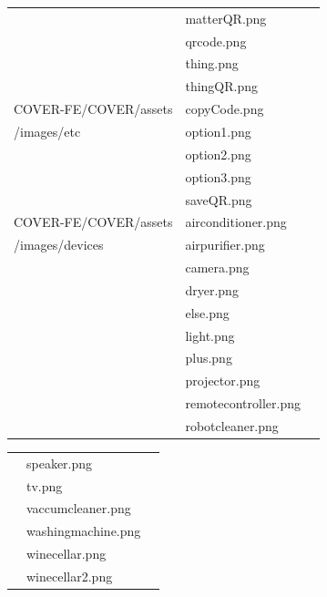 \documentclass[conference]{IEEEtran}
\begin{document}
\begin{enumerate}[label=\arabic*.]
\begin{table}[h!]
\begin{tabular}{|l|l|l|}
 & matterQR.png &  \\
 & qrcode.png &  \\
 & thing.png &  \\
 & thingQR.png &  \\
\hline
COVER-FE/COVER/assets & copyCode.png & \\
/images/etc & option1.png & \\
 & option2.png & \\
 & option3.png & \\
 & saveQR.png & \\
\hline
COVER-FE/COVER/assets & airconditioner.png & \\
/images/devices & airpurifier.png & \\
 & camera.png & \\
 & dryer.png & \\
 & else.png & \\
 & light.png & \\
 & plus.png & \\
 & projector.png & \\
 & remotecontroller.png & \\
 & robotcleaner.png & \\
\hline
\end{tabular}
\end{table}

\begin{table}[h!]
\setlength{\extrarowheight}{2.5pt}
\centering
\begin{tabular}{|p{2.8cm}|l|p{2cm}|}
\hline
 & speaker.png & \\
 & tv.png & \\
 & vaccumcleaner.png & \\
 & washingmachine.png & \\
 & winecellar.png & \\
 & winecellar2.png & \\
\hline
\end{tabular}
\end{table}


\end{enumerate}
\end{document}
